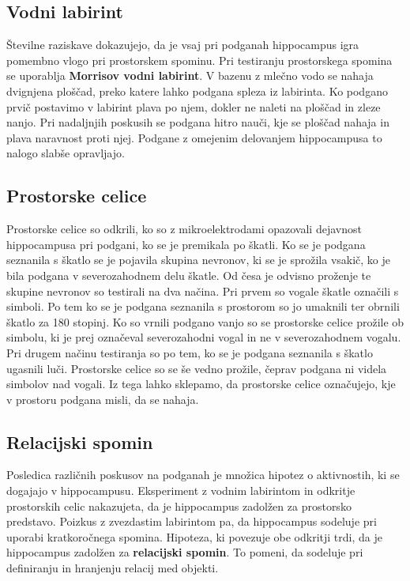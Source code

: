 \documentclass[10pt,a4paper]{article}
\begin{document}
\subsection{Vodni labirint}
Številne raziskave dokazujejo, da je vsaj pri podganah hippocampus igra pomembno vlogo pri prostorskem spominu. Pri testiranju prostorskega spomina se uporablja \textbf{Morrisov vodni labirint}. V bazenu z mlečno vodo se nahaja dvignjena ploščad, preko katere lahko podgana spleza iz labirinta. Ko podgano prvič postavimo v labirint plava po njem, dokler ne naleti na ploščad in zleze nanjo. Pri nadaljnjih poskusih se podgana hitro nauči, kje se ploščad nahaja in plava naravnost proti njej. Podgane z omejenim delovanjem hippocampusa to nalogo slabše opravljajo.

\subsection{Prostorske celice}
Prostorske celice so odkrili, ko so z mikroelektrodami opazovali dejavnost hippocampusa pri podgani, ko se je premikala po škatli. Ko se je podgana seznanila s škatlo se je pojavila skupina nevronov, ki se je sprožila vsakič, ko je bila podgana v severozahodnem delu škatle. Od česa je odvisno proženje te skupine nevronov so testirali na dva načina. Pri prvem so vogale škatle označili s simboli. Po tem ko se je podgana seznanila s prostorom so jo umaknili ter obrnili škatlo za 180 stopinj. Ko so vrnili podgano vanjo so se prostorske celice prožile ob simbolu, ki je prej označeval severozahodni vogal in ne v severozahodnem vogalu. Pri drugem načinu testiranja so po tem, ko se je podgana seznanila s škatlo ugasnili luči. Prostorske celice so se še vedno prožile, čeprav podgana ni videla simbolov nad vogali. Iz tega lahko sklepamo, da prostorske celice označujejo, kje v prostoru podgana misli, da se nahaja.

\subsection{Relacijski spomin}
Posledica različnih poskusov na podganah je množica hipotez o aktivnostih, ki se dogajajo v hippocampusu. Eksperiment z vodnim labirintom in odkritje prostorskih celic nakazujeta, da je hippocampus zadolžen za prostorsko predstavo. Poizkus z zvezdastim labirintom pa, da hippocampus sodeluje pri uporabi kratkoročnega spomina. Hipoteza, ki povezuje obe odkritji trdi, da je hippocampus zadolžen za \textbf{relacijski spomin}. To pomeni, da sodeluje pri definiranju in hranjenju relacij med objekti.
\end{document}
